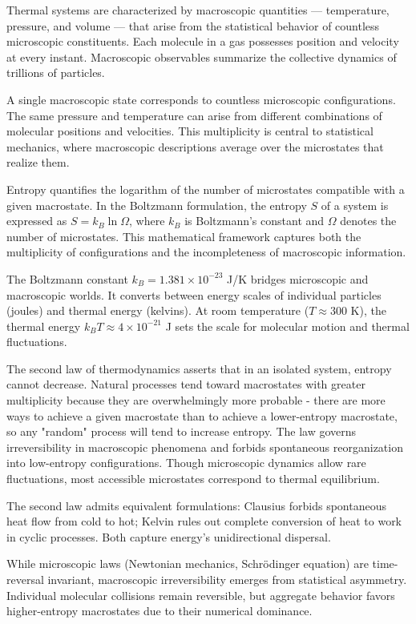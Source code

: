 Thermal systems are characterized by macroscopic quantities — temperature, pressure, and volume — that arise from the statistical behavior of countless microscopic constituents. Each molecule in a gas possesses position and velocity at every instant. Macroscopic observables summarize the collective dynamics of trillions of particles.

A single macroscopic state corresponds to countless microscopic configurations. The same pressure and temperature can arise from different combinations of molecular positions and velocities. This multiplicity is central to statistical mechanics, where macroscopic descriptions average over the microstates that realize them.

Entropy quantifies the logarithm of the number of microstates compatible with a given macrostate. In the Boltzmann formulation, the entropy $S$ of a system is expressed as $S = k_B \ln \Omega$, where $k_B$ is Boltzmann's constant and $\Omega$ denotes the number of microstates. This mathematical framework captures both the multiplicity of configurations and the incompleteness of macroscopic information.

The Boltzmann constant $k_B = 1.381 \times 10^{-23}$ J/K bridges microscopic and macroscopic worlds. It converts between energy scales of individual particles (joules) and thermal energy (kelvins). At room temperature ($T \approx 300$ K), the thermal energy $k_B T \approx 4 \times 10^{-21}$ J sets the scale for molecular motion and thermal fluctuations.

The second law of thermodynamics asserts that in an isolated system, entropy cannot decrease. Natural processes tend toward macrostates with greater multiplicity because they are overwhelmingly more probable - there are more ways to achieve a given macrostate than to achieve a lower-entropy macrostate, so any "random" process will tend to increase entropy. The law governs irreversibility in macroscopic phenomena and forbids spontaneous reorganization into low-entropy configurations. Though microscopic dynamics allow rare fluctuations, most accessible microstates correspond to thermal equilibrium.

The second law admits equivalent formulations: Clausius forbids spontaneous heat flow from cold to hot; Kelvin rules out complete conversion of heat to work in cyclic processes. Both capture energy's unidirectional dispersal.

While microscopic laws (Newtonian mechanics, Schrödinger equation) are time-reversal invariant, macroscopic irreversibility emerges from statistical asymmetry. Individual molecular collisions remain reversible, but aggregate behavior favors higher-entropy macrostates due to their numerical dominance.

